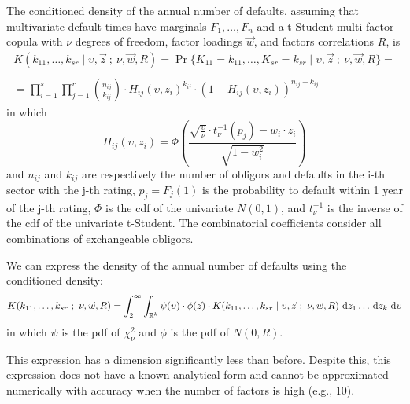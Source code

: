 \documentclass[11pt,fleqn]{book} %
\begin{document}
\begin{proposition}
	\label{prop:cdand}
	The conditioned density of the annual number of defaults, assuming 
	that multivariate default times have marginals $F_1,\dots,F_n$ and a 
	t-Student multi-factor copula with $\nu$ degrees of freedom, factor 
	loadings $\vec{w}$, and factors correlations $R$, is
	\begin{displaymath}
		\begin{array}{l}
			K(k_{11},\dots,k_{sr} \mid \upsilon,\vec{z}\ ;\ \nu,\vec{w}, R) = 
			\Pr\{K_{11}=k_{11},\dots,K_{sr}=k_{sr} \mid \upsilon,\vec{z}\ ;\ \nu, \vec{w}, R\} = \\
			\\
			= \displaystyle \prod_{i=1}^s \prod_{j=1}^r \binom{n_{ij}}{k_{ij}} \cdot
			H_{ij}(\upsilon,z_i)^{k_{ij}} \cdot
			\left( 1 - H_{ij}(\upsilon,z_i) \right)^{n_{ij}-k_{ij}}
		\end{array}
	\end{displaymath}
	in which
	\begin{displaymath}
		H_{ij}(\upsilon,z_i) = \Phi\left(  
		\frac{\sqrt{\frac{\upsilon}{\nu}} \cdot t_{\nu}^{-1}(p_j) - w_i\cdot z_i}{\sqrt{1-w_i^2}}
		\right)
	\end{displaymath}
	and $n_{ij}$ and $k_{ij}$ are respectively the number of obligors and 
	defaults in the i-th sector with the j-th rating, $p_j = F_j(1)$ 
	is the probability to default within 1 year of the j-th rating,
	$\Phi$ is the cdf of the univariate $N(0,1)$, and $t_{\nu}^{-1}$ is the 
	inverse of the cdf of the univariate t-Student. The combinatorial 
	coefficients consider all combinations of exchangeable obligors.
\end{proposition}

\begin{corollary}
	We can express the density of the annual number of defaults using 
	the conditioned density:
	\begin{displaymath}
			K(k_{11},\dots,k_{sr}\ ;\ \nu, \vec{w}, R) = 
			\displaystyle \int_2^{\infty} \int_{\mathbb{R}^k}
			\psi(\upsilon) \cdot \phi(\vec{z}) \cdot
			K(k_{11},\dots,k_{sr} \mid \upsilon,\vec{z}\ ;\ \nu,\vec{w}, R) 
			\ud z_1 \dots \ud z_k \ud \upsilon
	\end{displaymath}
	in which $\psi$ is the pdf of $\chi_{\nu}^2$ and $\phi$ is the pdf 
	of $N(0,R)$.
\end{corollary}

This expression has a dimension significantly less than before. Despite 
this, this expression does not have a known analytical form and cannot 
be approximated numerically with accuracy when the number of factors is 
high (e.g., 10).
\end{document}
